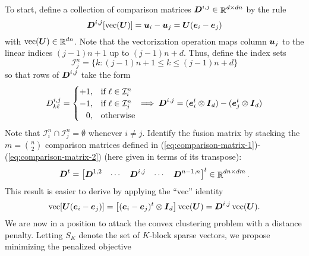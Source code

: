\documentclass[11pt]{article}
\begin{document}
To start, define a collection of comparison matrices \(\boldsymbol{D}^{i,j} \in \mathop{\mathbb{R}}\nolimits^{d \times dn}\) by the rule
\begin{equation}
    \label{eq:comparison-matrix-1}
    \boldsymbol{D}^{i,j}[\mathop{\rm vec}\nolimits(\boldsymbol{U})]
    =
    \boldsymbol{u}_{i} - \boldsymbol{u}_{j}
    =
    \boldsymbol{U} (\boldsymbol{e}_{i} - \boldsymbol{e}_{j})
\end{equation}
with \(\mathop{\rm vec}\nolimits(\boldsymbol{U}) \in \mathop{\mathbb{R}}\nolimits^{dn}\).
Note that the vectorization operation maps column \(\boldsymbol{u}_{j}\) to the linear indices \((j-1)n + 1\) up to \((j-1)n + d\).
Thus, define the index sets
\begin{equation*}
    \label{eq:index-sets}
    \mathcal{I}_{j}^{n}
    =
    \{k : (j-1)n + 1 \le k \le (j-1)n + d\}
\end{equation*}
so that rows of \(\boldsymbol{D}^{i,j}\) take the form
\begin{equation}
    \label{eq:comparison-matrix-2}
    D_{k\ell}^{i,j}
    =
    \begin{cases}
        +1, & \text{if \(\ell \in \mathcal{I}_{i}^{n}\)} \\
        -1, & \text{if \(\ell \in \mathcal{I}_{j}^{n}\)} \\
        \phantom{+}0, & \text{otherwise}
    \end{cases}
    \implies
    \boldsymbol{D}^{i,j}
    =
    (\boldsymbol{e}_{i}^{t} \otimes \boldsymbol{I}_{d})
    -
    (\boldsymbol{e}_{j}^{t} \otimes \boldsymbol{I}_{d})
\end{equation}
Note that \(\mathcal{I}_{i}^{n} \cap \mathcal{I}_{j}^{n} = \emptyset\) whenever \(i \neq j\).
Identify the fusion matrix by stacking the \(m = \binom{n}{2}\) comparison matrices defined in (\ref{eq:comparison-matrix-1})-(\ref{eq:comparison-matrix-2}) (here given in terms of its transpose):
\begin{equation}
    \label{eq:fusion-matrix}
    \boldsymbol{D}^{t}
    =
    \begin{bmatrix}
        \boldsymbol{D}^{1,2}
        & \cdots
        & \boldsymbol{D}^{i,j}
        & \cdots
        & \boldsymbol{D}^{n-1,n}
    \end{bmatrix}^{t}
    \in
    \mathop{\mathbb{R}}\nolimits^{dn \times dm}.
\end{equation}
This result is easier to derive by applying the ``vec'' identity
\begin{equation*}
    \mathop{\rm vec}\nolimits[\boldsymbol{U} (\boldsymbol{e}_{i} - \boldsymbol{e}_{j})]
    =
    \left[(\boldsymbol{e}_{i} - \boldsymbol{e}_{j})^{t} \otimes \boldsymbol{I}_{d}\right] \mathop{\rm vec}\nolimits(\boldsymbol{U})
    =
    \boldsymbol{D}^{i,j} \mathop{\rm vec}\nolimits(\boldsymbol{U}).
\end{equation*}
We are now in a position to attack the convex clustering problem with a distance penalty.
Letting \(S_{K}\) denote the set of \(K\)-block sparse vectors, we propose minimizing the penalized objective
\end{document}
